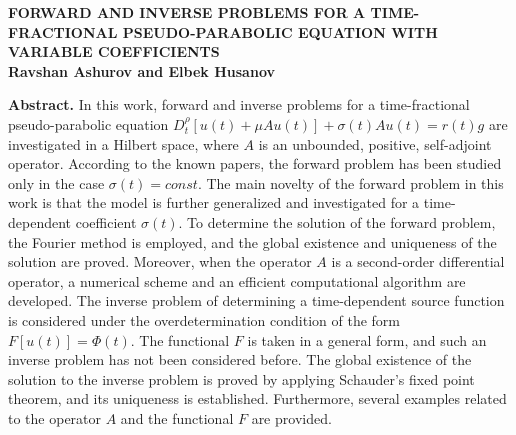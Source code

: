 \documentclass[reqno]{amsart}
\theoremstyle{definition}
\numberwithin{equation}{section}
\begin{document}
\sloppy

\begin{center}
\textbf{\large  FORWARD AND INVERSE PROBLEMS FOR A TIME-FRACTIONAL PSEUDO-PARABOLIC EQUATION WITH VARIABLE COEFFICIENTS}\\

\textbf{ Ravshan Ashurov and Elbek Husanov}
\author[R. Ashurov and E. Husanov]
{Ravshan Ashurov and Elbek Husanov}

\address{\textcolor[rgb]{0.00,0.00,0.84}{Ravshan Ashurov:\newline 
V.~I.~Romanovskiy Institute of Mathematics Uzbekistan Academy of Sciences, University street 9, Tashkent, 100174, Uzbekistan. \newline
Central Asian University, 264 Milliy Bog Street, Tashkent, 111221, Uzbekistan.
}}
\email{\textcolor[rgb]{0.00,0.00,0.84}{ashurovr@gmail.com}}


\address{\textcolor[rgb]{0.00,0.00,0.84}{Elbek Husanov: \newline
V.~I.~Romanovskiy Institute of Mathematics Uzbekistan Academy of Sciences, University street 9, Tashkent, 100174, Uzbekistan.
}}
\email{\textcolor[rgb]{0.00,0.00,0.84}{elbekhusanov02@gmail.com}}

\end{center}

\textbf{Abstract.} In this work, forward and inverse problems for a time-fractional pseudo-parabolic equation $D_t^{\rho} [u(t) + \mu Au(t)] +
\sigma(t) Au(t) = r(t)g$ are investigated in a Hilbert space, where $A$ is an unbounded, positive, self-adjoint operator. According to the known papers, the forward problem has been studied only in the case $\sigma(t) = const$. The main novelty of
the forward problem in this work is that the model is further generalized and investigated for a time-dependent coefficient $\sigma(t)$. To determine the solution of the forward problem, the Fourier method is employed, and the global existence and uniqueness of the solution are proved. Moreover, when the operator $A$ is a second-order differential operator, a numerical scheme and an efficient computational algorithm are developed. The
inverse problem of determining a time-dependent source function is considered under the overdetermination condition of the form $F[u(t)] = \Phi(t)$. The functional $F$ is taken in a general form, and such an inverse problem has not been considered before. The global existence of the solution to the inverse problem is proved by applying Schauder's fixed point theorem, and its
uniqueness is established. Furthermore, several examples related to the operator $A$ and the functional $F$ are provided. 
\end{document}
